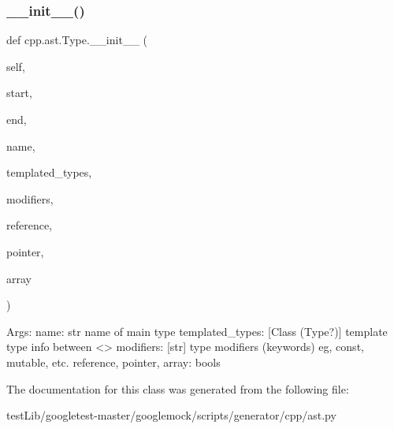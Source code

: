 \subsubsection{\texorpdfstring{\+\_\+\+\_\+init\+\_\+\+\_\+()}{\_\_init\_\_()}}
{\footnotesize\ttfamily def cpp.\+ast.\+Type.\+\_\+\+\_\+init\+\_\+\+\_\+ (\begin{DoxyParamCaption}\item[{}]{self,  }\item[{}]{start,  }\item[{}]{end,  }\item[{}]{name,  }\item[{}]{templated\+\_\+types,  }\item[{}]{modifiers,  }\item[{}]{reference,  }\item[{}]{pointer,  }\item[{}]{array }\end{DoxyParamCaption})}

\begin{DoxyVerb}Args:
  name: str name of main type
  templated_types: [Class (Type?)] template type info between <>
  modifiers: [str] type modifiers (keywords) eg, const, mutable, etc.
  reference, pointer, array: bools
\end{DoxyVerb}
 

The documentation for this class was generated from the following file\+:\begin{DoxyCompactItemize}
\item 
test\+Lib/googletest-\/master/googlemock/scripts/generator/cpp/ast.\+py\end{DoxyCompactItemize}
